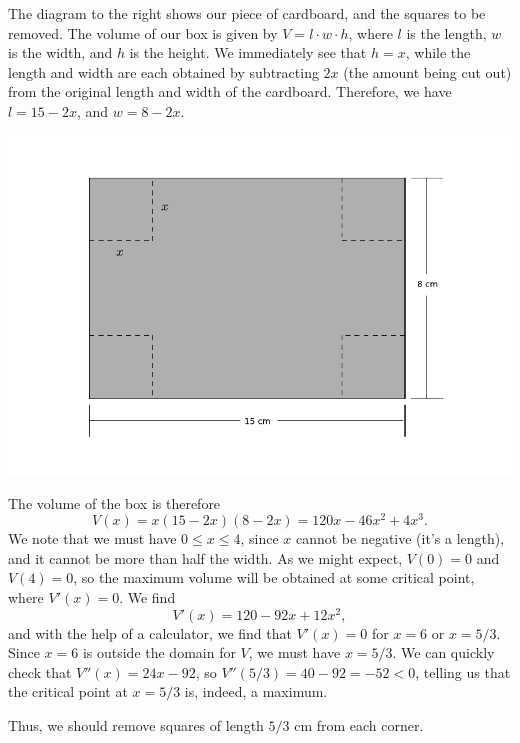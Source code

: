 \documentclass[12pt]{article}
\begin{document}
\begin{enumerate}
\begin{multicols}{2}
 The diagram to the right shows our piece of cardboard, and the squares to be removed. The volume of our box is given by $V=l\cdot w\cdot h$, where $l$ is the length, $w$ is the width, and $h$ is the height. We immediately see that $h=x$, while the length and width are each obtained by subtracting $2x$ (the amount being cut out) from the original length and width of the cardboard. Therefore, we have $l=15-2x$, and $w=8-2x$.
 \columnbreak
 \begin{center}
  \includegraphics[width=0.9\columnwidth]{WS7-3sol}
 \end{center}

\end{multicols}
The volume of the box is therefore
\[
 V(x) = x(15-2x)(8-2x) = 120x-46x^2+4x^3.
\]
We note that we must have $0\leq x\leq 4$, since $x$ cannot be negative (it's a length), and it cannot be more than half the width. As we might expect, $V(0)=0$ and $V(4)=0$, so the maximum volume will be obtained at some critical point, where $V'(x)=0$. We find
\[
 V'(x) = 120-92x+12x^2,
\]
and with the help of a calculator, we find that $V'(x)=0$ for $x=6$ or $x=5/3$. Since $x=6$ is outside the domain for $V$, we must have $x=5/3$. We can quickly check that $V''(x)=24x-92$, so $V''(5/3) = 40-92=-52<0$, telling us that the critical point at $x=5/3$ is, indeed, a maximum.

Thus, we should remove squares of length $5/3$ cm from each corner.
\end{enumerate}
\end{document}
